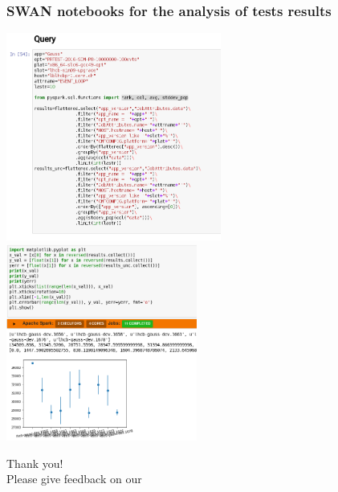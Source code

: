 {\begin{frame}
\begin{itemize}
{
}

\end{itemize}
\end{frame}

\begin{frame}
\frametitle{SWAN notebooks for the analysis of tests results}
\begin{center}
\includegraphics[width=0.53\textwidth]{query.png}
\includegraphics[width=0.47\textwidth]{notebook.png}

\end{center}
\end{frame}


\begin{frame}
\center Thank you! \\ Please give feedback on our \href{https://mattermost.web.cern.ch/lhcb/channels/lhcbpr2}{}


\end{frame}}
